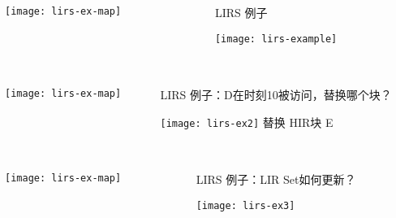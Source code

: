 \begin{frame}[plain]
	\frametitle{ }
	\begin{columns}
		\begin{column}{.4\textwidth}
			\centering
				\texttt{[image: lirs-ex-map]}
		\end{column}
		
		\begin{column}{.6\textwidth}
			LIRS 例子
			
		\texttt{[image: lirs-example]}
			
		\end{column}
		
		
	\end{columns}
\end{frame}


\begin{frame}[plain]
	\frametitle{ }
	\begin{columns}
		\begin{column}{.4\textwidth}
			\centering
			\texttt{[image: lirs-ex-map]}
		\end{column}
		
		\begin{column}{.6\textwidth}
			LIRS 例子：D在时刻10被访问，替换哪个块？
			
			\texttt{[image: lirs-ex2]}
			\pause
			\centering
			替换 HIR块 E	
		\end{column}
		
		
	\end{columns}
\end{frame}




\begin{frame}[plain]
	\frametitle{ }
	\begin{columns}
		\begin{column}{.4\textwidth}
			\centering
			\texttt{[image: lirs-ex-map]}
		\end{column}
		
		\begin{column}{.6\textwidth}
			LIRS 例子：LIR Set如何更新？
			
			\texttt{[image: lirs-ex3]}
			

		\end{column}
		
		
	\end{columns}
\end{frame}


